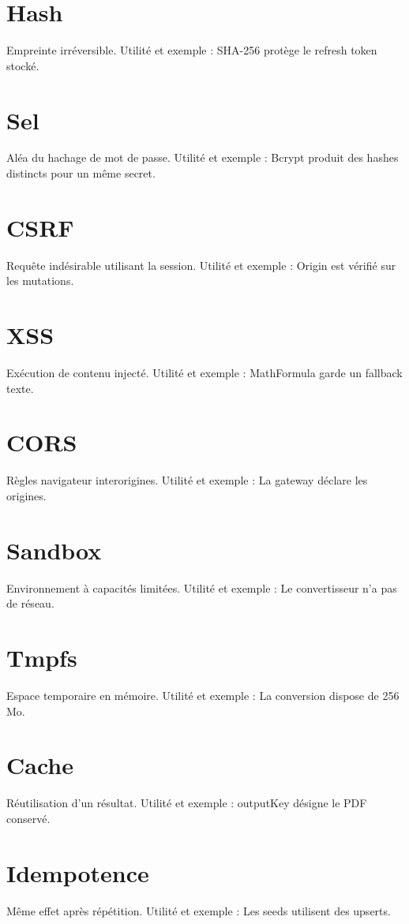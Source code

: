 \section*{Hash}
Empreinte irréversible. Utilité et exemple : SHA-256 protège le refresh token stocké.

\section*{Sel}
Aléa du hachage de mot de passe. Utilité et exemple : Bcrypt produit des hashes distincts pour un même secret.

\section*{CSRF}
Requête indésirable utilisant la session. Utilité et exemple : Origin est vérifié sur les mutations.

\section*{XSS}
Exécution de contenu injecté. Utilité et exemple : MathFormula garde un fallback texte.

\section*{CORS}
Règles navigateur interorigines. Utilité et exemple : La gateway déclare les origines.

\section*{Sandbox}
Environnement à capacités limitées. Utilité et exemple : Le convertisseur n’a pas de réseau.

\section*{Tmpfs}
Espace temporaire en mémoire. Utilité et exemple : La conversion dispose de 256 Mo.

\section*{Cache}
Réutilisation d’un résultat. Utilité et exemple : outputKey désigne le PDF conservé.

\section*{Idempotence}
Même effet après répétition. Utilité et exemple : Les seeds utilisent des upserts.

